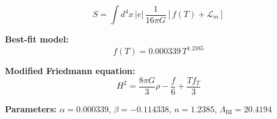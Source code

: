 
\begin{equation}
  S = \int d^4x \, |e| \, \frac{1}{16\pi G} \left[ f(T) + \mathcal{L}_m \right]
\end{equation}

\textbf{Best-fit model:}
\begin{equation}
  f(T) = 0.000339 \, T^{1.2385}
\end{equation}

\textbf{Modified Friedmann equation:}
\begin{equation}
  H^2 = \frac{8\pi G}{3} \rho - \frac{f}{6} + \frac{T f_T}{3}
\end{equation}

\textbf{Parameters:}
$\alpha = 0.000339$, \quad
$\beta = -0.114338$, \quad
$n = 1.2385$, \quad
$\Lambda_{\text{BI}} = 20.4194$